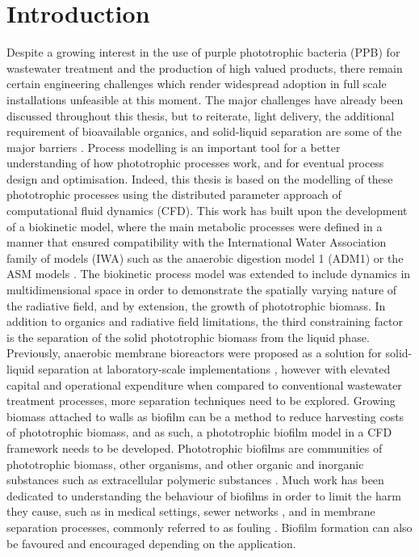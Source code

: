 \section{Introduction}
Despite a growing interest in the use of purple phototrophic bacteria (PPB) for wastewater treatment and the production of high valued products, there remain certain engineering challenges which render widespread adoption in full scale installations unfeasible at this moment.
The major challenges have already been discussed throughout this thesis, but to reiterate, light delivery, the additional requirement of bioavailable organics, and solid-liquid separation are some of the major barriers \cite{hulsen2016}. 
Process modelling is an important tool for a better understanding of how phototrophic processes work, and for eventual process design and optimisation. 
Indeed, this thesis is based on the modelling of these phototrophic processes using the distributed parameter approach of computational fluid dynamics (CFD). 
This work has built upon the development of a biokinetic model, where the main metabolic processes were defined in a manner that ensured compatibility with the International Water Association family of models (IWA) such as the anaerobic digestion model 1 (ADM1) \cite{batstone2002} or the ASM models \cite{henze2000}. 
The biokinetic process model was extended to include dynamics in multidimensional space in order to demonstrate the spatially varying nature of the radiative field, and by extension, the growth of phototrophic biomass. 
In addition to organics and radiative field limitations, the third constraining factor is the separation of the solid phototrophic biomass from the liquid phase. 
Previously, anaerobic membrane bioreactors were proposed as a solution for solid-liquid separation at laboratory-scale implementations \cite{hulsen2016}, however with elevated capital and operational expenditure when compared to conventional wastewater treatment processes, more separation techniques need to be explored. 
Growing biomass attached to walls as biofilm can be a method to reduce harvesting costs of phototrophic biomass, and as such, a phototrophic biofilm model in a CFD framework needs to be developed. 
\skippingparagraph
Phototrophic biofilms are communities of phototrophic biomass, other organisms, and other organic and inorganic substances such as extracellular polymeric substances \cite{vanloosdrecht2002}. 
Much work has been dedicated to understanding the behaviour of biofilms in order to limit the harm they cause, such as in medical settings, sewer networks \cite{pikaar2014}, and in membrane separation processes, commonly referred to as fouling \cite{radaei2018}. Biofilm formation can also be favoured and encouraged depending on the application. 
